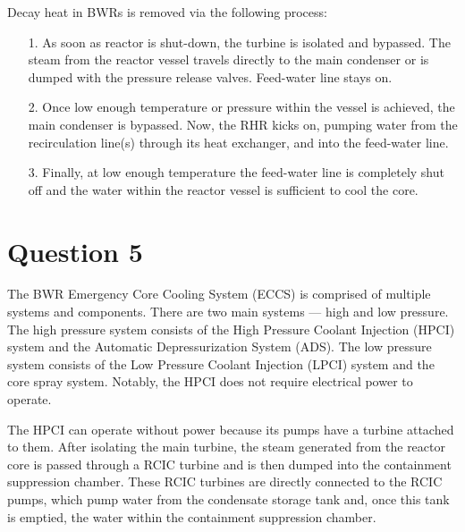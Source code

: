 \documentclass{article}
\begin{document}
Decay heat in BWRs is removed via the following process:

\begin{itemize}
    \item[1.] As soon as reactor is shut-down, the turbine is isolated and bypassed. The steam from the reactor vessel travels directly to the main condenser or is dumped with the pressure release valves. Feed-water line stays on.
    \item[2.] Once low enough temperature or pressure within the vessel is achieved, the main condenser is bypassed. Now, the RHR kicks on, pumping water from the recirculation line(s) through its heat exchanger, and into the feed-water line. 
    \item[3.] Finally, at low enough temperature the feed-water line is completely shut off and the water within the reactor vessel is sufficient to cool the core.
    
\end{itemize}

\section*{Question 5}

The BWR Emergency Core Cooling System (ECCS) is comprised of multiple systems and components. There are two main systems --- high and low pressure. The high pressure system consists of the High Pressure Coolant Injection (HPCI) system and the Automatic Depressurization System (ADS). The low pressure system consists of the Low Pressure Coolant Injection (LPCI) system and the core spray system. Notably, the HPCI does not require electrical power to operate. 

The HPCI can operate without power because its pumps have a turbine attached to them. After isolating the main turbine, the steam generated from the reactor core is passed through a RCIC turbine and is then dumped into the containment suppression chamber. These RCIC turbines are directly connected to the RCIC pumps, which pump water from the condensate storage tank and, once this tank is emptied, the water within the containment suppression chamber.
\end{document}
